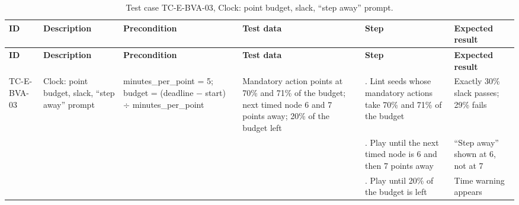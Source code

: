 {\footnotesize{}\renewcommand{\arraystretch}{1.1}
\begin{longtable}{|>{\raggedright\arraybackslash}p{}|>{\raggedright\arraybackslash}p{}|>{\raggedright\arraybackslash}p{}|>{\raggedright\arraybackslash}p{}|>{\raggedright\arraybackslash}p{}|>{\raggedright\arraybackslash}p{}|}
\caption{Test case TC-\allowbreak{}E-\allowbreak{}BVA-\allowbreak{}03, Clock: point budget, slack, ``step away'' prompt.} \\
\hline
\textbf{ID} & \textbf{Description} & \textbf{Precondition} & \textbf{Test data} & \textbf{Step} & \textbf{Expected result} \\ \hline
\endfirsthead
\hline
\textbf{ID} & \textbf{Description} & \textbf{Precondition} & \textbf{Test data} & \textbf{Step} & \textbf{Expected result} \\ \hline
\endhead
TC-E-BVA-03 & Clock: point budget, slack, ``step away'' prompt & minutes\_\allowbreak{}per\_\allowbreak{}point = 5; budget = (deadline $-$ start) $\div$ minutes\_\allowbreak{}per\_\allowbreak{}point & Mandatory action points at 70\% and 71\% of the budget; next timed node 6 and 7 points away; 20\% of the budget left & 1. Lint seeds whose mandatory actions take 70\% and 71\% of the budget & Exactly 30\% slack passes; 29\% fails \\ \cline{5-6}
 &  &  &  & 2. Play until the next timed node is 6 and then 7 points away & ``Step away'' shown at 6, not at 7 \\ \cline{5-6}
 &  &  &  & 3. Play until 20\% of the budget is left & Time warning appears \\ \hline
\end{longtable}
}

